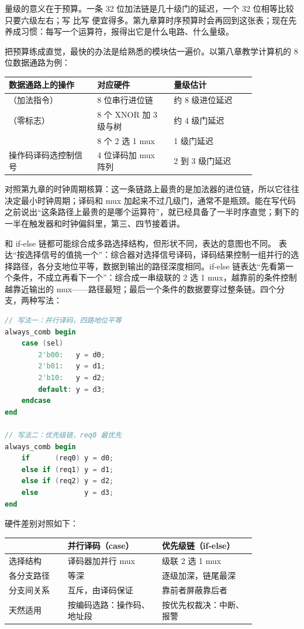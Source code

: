量级的意义在于预算。一条 32 位加法链是几十级门的延迟，一个 32 位相等比较只要六级左右；写  比写  便宜得多。第九章算时序预算时会再回到这张表；现在先养成习惯：每写一个运算符，报得出它是什么电路、什么量级。

把预算练成直觉，最快的办法是给熟悉的模块估一遍价。以第八章教学计算机的 8 位数据通路为例：

\begin{longtable}{L{0.3\linewidth}L{0.26\linewidth}L{0.28\linewidth}}
\toprule
数据通路上的操作 & 对应硬件 & 量级估计 \\
\midrule
{}（加法指令） & 8 位串行进位链 & 约 8 级进位延迟 \\
（零标志） & 8 个 XNOR 加 3 级与树 & 约 4 级门延迟 \\
 & 8 个 2 选 1 mux & 1 级门延迟 \\
操作码译码选控制信号 & 4 位译码加 mux 阵列 & 2 到 3 级门延迟 \\
\bottomrule
\end{longtable}

对照第九章的时钟周期核算：这一条链路上最贵的是加法器的进位链，所以它往往决定最小时钟周期；译码和 mux 加起来不过几级门，通常不是瓶颈。能在写代码之前说出“这条路径上最贵的是哪个运算符”，就已经具备了一半时序直觉；剩下的一半在触发器和时钟偏斜里，第三、四节接着讲。

 和 if-else 链都可能综合成多路选择结构，但形状不同，表达的意图也不同。 表达“按选择信号的值挑一个”：综合器对选择信号译码，译码结果控制一组并行的选择路径，各分支地位平等，数据到输出的路径深度相同。if-else 链表达“先看第一个条件，不成立再看下一个”：综合成一串级联的 2 选 1 mux，越靠前的条件控制越靠近输出的 mux——路径最短；最后一个条件的数据要穿过整条链。四个分支，两种写法：

\begin{lstlisting}[language=Verilog]
// 写法一：并行译码，四路地位平等
always_comb begin
    case (sel)
        2'b00:   y = d0;
        2'b01:   y = d1;
        2'b10:   y = d2;
        default: y = d3;
    endcase
end

// 写法二：优先级链，req0 最优先
always_comb begin
    if      (req0) y = d0;
    else if (req1) y = d1;
    else if (req2) y = d2;
    else           y = d3;
end
\end{lstlisting}

硬件差别对照如下：

\begin{longtable}{L{0.2\linewidth}L{0.32\linewidth}L{0.32\linewidth}}
\toprule
 & 并行译码（case） & 优先级链（if-else） \\
\midrule
选择结构 & 译码器加并行 mux & 级联 2 选 1 mux \\
各分支路径 & 等深 & 逐级加深，链尾最深 \\
分支间关系 & 互斥，由译码保证 & 靠前者屏蔽靠后者 \\
天然适用 & 按编码选路：操作码、地址段 & 按优先权裁决：中断、报警 \\
\bottomrule
\end{longtable}

